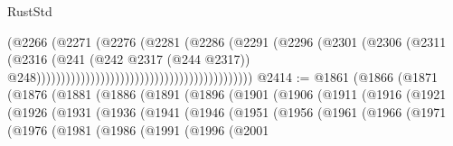 \begin{lexlean}{RustStd}
\begin{coremodule}
                                                                    (@2266
                                                                      (@2271
                                                                        (@2276
                                                                          (@2281
                                                                            (@2286
                                                                              (@2291
                                                                                (@2296
                                                                                  (@2301
                                                                                    (@2306
                                                                                      (@2311
                                                                                        (@2316
                                                                                          (@241
                                                                                            (@242
                                                                                              @2317
                                                                                              (@244
                                                                                                @2317))
                                                                                            @248))))))))))))))))))))))))))))))))))))))))))))
@2414 := @1861
    (@1866
      (@1871
        (@1876
          (@1881
            (@1886
              (@1891
                (@1896
                  (@1901
                    (@1906
                      (@1911
                        (@1916
                          (@1921
                            (@1926
                              (@1931
                                (@1936
                                  (@1941
                                    (@1946
                                      (@1951
                                        (@1956
                                          (@1961
                                            (@1966
                                              (@1971
                                                (@1976
                                                  (@1981
                                                    (@1986
                                                      (@1991
                                                        (@1996
                                                          (@2001

\end{coremodule}
\end{lexlean}
